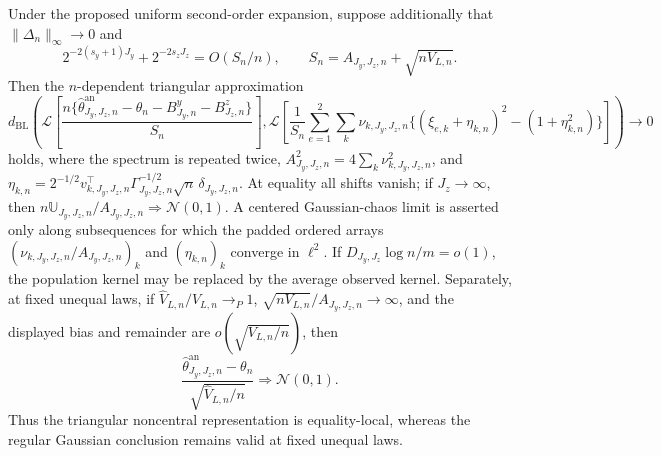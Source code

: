 Under the proposed uniform second-order expansion, suppose additionally that \(\|\Delta_n\|_\infty\to0\) and
\[
2^{-2(s_y+1)J_y}+2^{-2s_zJ_z}=O(S_n/n),
\qquad S_n=A_{J_y,J_z,n}+\sqrt{nV_{L,n}}.
\]
Then the \(n\)-dependent triangular approximation
\[
d_{\mathrm{BL}}\!\left(\mathcal L\left[\frac{n\{\widehat\theta^{\mathrm{an}}_{J_y,J_z,n}-\theta_n-B^y_{J_y,n}-B^z_{J_z,n}\}}{S_n}\right],\mathcal L\left[\frac{1}{S_n}\sum_{e=1}^2\sum_k\nu_{k,J_y,J_z,n}\{(\xi_{e,k}+\eta_{k,n})^2-(1+\eta_{k,n}^2)\}\right]\right)\to0
\]
holds, where the spectrum is repeated twice, \(A_{J_y,J_z,n}^2=4\sum_k\nu_{k,J_y,J_z,n}^2\), and \(\eta_{k,n}=2^{-1/2}v_{k,J_y,J_z,n}^{\top}\Gamma_{J_y,J_z,n}^{-1/2}\sqrt n\,\delta_{J_y,J_z,n}\). At equality all shifts vanish; if \(J_z\to\infty\), then \(n\mathbb U_{J_y,J_z,n}/A_{J_y,J_z,n}\Rightarrow\mathcal N(0,1)\). A centered Gaussian-chaos limit is asserted only along subsequences for which the padded ordered arrays \((\nu_{k,J_y,J_z,n}/A_{J_y,J_z,n})_k\) and \((\eta_{k,n})_k\) converge in \(\ell^2\). If \(D_{J_y,J_z}\log n/m=o(1)\), the population kernel may be replaced by the average observed kernel. Separately, at fixed unequal laws, if \(\widehat V_{L,n}/V_{L,n}\to_P1\), \(\sqrt{nV_{L,n}}/A_{J_y,J_z,n}\to\infty\), and the displayed bias and remainder are \(o(\sqrt{V_{L,n}/n})\), then
\[
\frac{\widehat\theta^{\mathrm{an}}_{J_y,J_z,n}-\theta_n}{\sqrt{\widehat V_{L,n}/n}}\Rightarrow\mathcal N(0,1).
\]
Thus the triangular noncentral representation is equality-local, whereas the regular Gaussian conclusion remains valid at fixed unequal laws.